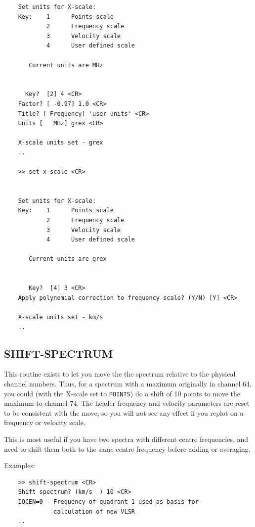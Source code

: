 \documentclass[11pt,twoside]{report}
\begin{document}
\begin{verbatim}
    Set units for X-scale:
    Key:    1      Points scale
            2      Frequency scale
            3      Velocity scale
            4      User defined scale

       Current units are MHz


      Key?  [2] 4 <CR>
    Factor? [ -0.97] 1.0 <CR>
    Title? [ Frequency] 'user units' <CR>
    Units [   MHz] grex <CR>

    X-scale units set - grex
    ..

    >> set-x-scale <CR>


    Set units for X-scale:
    Key:    1      Points scale
            2      Frequency scale
            3      Velocity scale
            4      User defined scale

       Current units are grex


       Key?  [4] 3 <CR>
    Apply polynomial correction to frequency scale? (Y/N) [Y] <CR>

    X-scale units set - km/s
    ..
\end{verbatim}

\subsection{SHIFT-SPECTRUM} 

This routine exists to let you move the the spectrum relative to the
physical channel numbers. Thus, for a spectrum with a maximum originally
in channel 64, you could (with the X-scale set to \verb+POINTS+) do a
shift of 10 points to move the maximum to channel 74. The header frequency
and velocity parameters are reset to be consistent with the move, so you
will not see any effect if you replot on a frequency or velocity scale.

This is most useful if you have two spectra with different centre frequencies,
and need to shift them both to the same centre frequency before adding or
averaging.

Examples:
\begin{verbatim}
    >> shift-spectrum <CR>
    Shift spectrum? (km/s  ) 10 <CR>
    IQCEN=0 - Frequency of quadrant 1 used as basis for
              calculation of new VLSR
    ..
\end{verbatim}
\end{document}
